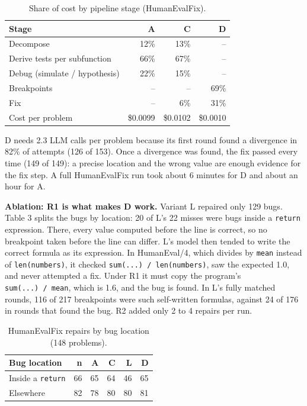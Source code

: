 \documentclass[
  10pt,
  twocolumn]{article}
\begin{document}
\begin{table}[h]\small\centering
\caption{Share of cost by pipeline stage (HumanEvalFix).}
\begin{tabular}{lrrr}\toprule
Stage & A & C & D \\ \midrule
Decompose & 12\% & 13\% & -- \\
Derive tests per subfunction & 66\% & 67\% & -- \\
Debug (simulate / hypothesis) & 22\% & 15\% & -- \\
Breakpoints & -- & -- & 69\% \\
Fix & -- & 6\% & 31\% \\ \midrule
Cost per problem & \$0.0099 & \$0.0102 & \$0.0010 \\ \bottomrule
\end{tabular}\end{table}

D needs 2.3 LLM calls per problem because its first round found a
divergence in 82\% of attempts (126 of 153). Once a divergence was
found, the fix passed every time (149 of 149): a precise location and
the wrong value are enough evidence for the fix step. A full
HumanEvalFix run took about 6 minutes for D and about an hour for A.

\textbf{Ablation: R1 is what makes D work.} Variant L repaired only 129
bugs. Table 3 splits the bugs by location: 20 of L's 22 misses were bugs
inside a \texttt{return} expression. There, every value computed before
the line is correct, so no breakpoint taken before the line can differ.
L's model then tended to write the correct formula as its expression. In
HumanEval/4, which divides by \texttt{mean} instead of
\texttt{len(numbers)}, it checked \texttt{sum(...)\ /\ len(numbers)},
saw the expected 1.0, and never attempted a fix. Under R1 it must copy
the program's \texttt{sum(...)\ /\ mean}, which is 1.6, and the bug is
found. In L's fully matched rounds, 116 of 217 breakpoints were such
self-written formulas, against 24 of 176 in rounds that found the bug.
R2 added only 2 to 4 repairs per run.

\begin{table}[h]\small\centering
\caption{HumanEvalFix repairs by bug location (148 problems).}
\begin{tabular}{lrrrrr}\toprule
Bug location & n & A & C & L & D \\ \midrule
Inside a \texttt{return} & 66 & 65 & 64 & 46 & 65 \\
Elsewhere & 82 & 78 & 80 & 80 & 81 \\ \bottomrule
\end{tabular}\end{table}
\end{document}
